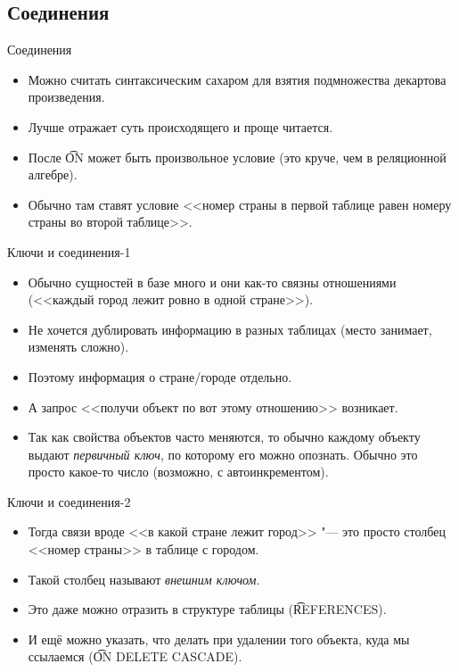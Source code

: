 \subsection{Соединения}

\begin{frame}{Соединения}
	\begin{itemize}
		\item Можно считать синтаксическим сахаром для взятия подмножества декартова произведения.
		\item Лучше отражает суть происходящего и проще читается.
		\item После \t{ON} может быть произвольное условие (это круче, чем в реляционной алгебре).
		\item Обычно там ставят условие <<номер страны в первой таблице равен номеру страны во второй таблице>>.
	\end{itemize}
\end{frame}

\begin{frame}{Ключи и соединения-1}
	\begin{itemize}
		\item Обычно сущностей в базе много и они как-то связны отношениями (<<каждый город лежит ровно в одной стране>>).
		\item Не хочется дублировать информацию в разных таблицах (место занимает, изменять сложно).
		\item Поэтому информация о стране/городе отдельно.
		\item А запрос <<получи объект по вот этому отношению>> возникает.
		\item
			Так как свойства объектов часто меняются, то обычно каждому объекту выдают \textit{первичный ключ},
			по которому его можно опознать.
			Обычно это просто какое-то число (возможно, с автоинкрементом).
	\end{itemize}
\end{frame}

\begin{frame}{Ключи и соединения-2}
	\begin{itemize}
		\item Тогда связи вроде <<в какой стране лежит город>> "--- это просто столбец <<номер страны>> в таблице с городом.
		\item Такой столбец называют \textit{внешним ключом}.
		\item Это даже можно отразить в структуре таблицы (\t{REFERENCES}).
		\item И ещё можно указать, что делать при удалении того объекта, куда мы ссылаемся (\t{ON DELETE CASCADE}).
	\end{itemize}
\end{frame}

